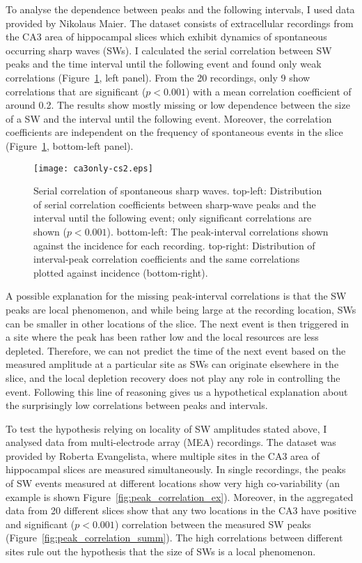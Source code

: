     To analyse the dependence between peaks and the following intervals, I used
    data provided by Nikolaus Maier. The dataset consists of extracellular
    recordings from the CA3 area of hippocampal slices which exhibit dynamics
    of spontaneous occurring sharp waves (SWs). I calculated the serial
    correlation between SW peaks and the time interval until the following
    event and found only weak correlations (Figure~\ref{fig:ca3only_SCsumm},
    left panel). From the 20 recordings, only 9 show correlations that are
    significant ($p<0.001$) with a mean correlation coefficient of around 0.2.
    The results show mostly missing or low dependence between the size of a SW
    and the interval until the following event. Moreover, the correlation
    coefficients are independent on the frequency of spontaneous events in the
    slice (Figure~\ref{fig:ca3only_SCsumm}, bottom-left panel).

    \begin{figure}
      \texttt{[image: ca3only-cs2.eps]}
      \caption{
        Serial correlation of spontaneous sharp waves. top-left: Distribution
        of serial correlation coefficients between sharp-wave peaks and the
        interval until the following event; only significant correlations are
        shown ($p<0.001$). bottom-left: The peak-interval correlations shown
        against the incidence for each recording. top-right: Distribution of
        interval-peak correlation coefficients and the same correlations
        plotted against incidence (bottom-right).
             }
    \label{fig:ca3only_SCsumm}
    \end{figure}

    A possible explanation for the missing peak-interval correlations is that
    the SW peaks are local phenomenon, and while being large at the recording
    location, SWs can be smaller in other locations of the slice. The next
    event is then triggered in a site where the peak has been rather low and
    the local resources are less depleted. Therefore, we can not predict the
    time of the next event based on the measured amplitude at a particular site
    as SWs can originate elsewhere in the slice, and the local depletion
    recovery does not play any role in controlling the event. Following this
    line of reasoning gives us a hypothetical explanation about the
    surprisingly low correlations between peaks and intervals.

    To test the hypothesis relying on locality of SW amplitudes stated above, I
    analysed data from multi-electrode array (MEA) recordings. The dataset was
    provided by Roberta Evangelista, where multiple sites in the CA3 area of
    hippocampal slices are measured simultaneously. In single recordings, the
    peaks of SW events measured at different locations show very high
    co-variability (an example is shown Figure~\ref{fig:peak_correlation_ex}).
    Moreover, in the aggregated data from 20 different slices show that any two
    locations in the CA3 have positive and significant ($p<0.001$) correlation
    between the measured SW peaks (Figure~\ref{fig:peak_correlation_summ}). The
    high correlations between different sites rule out the hypothesis that the
    size of SWs is a local phenomenon.

